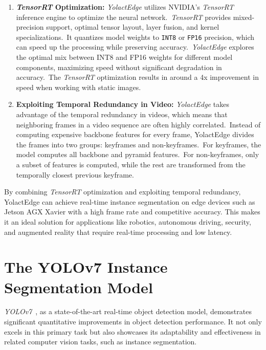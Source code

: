 \begin{enumerate}
    \item \textbf{\textit{TensorRT} Optimization:} \textit{YolactEdge} utilizes NVIDIA's \textit{TensorRT}~\cite{vanholder2016efficient} inference engine to optimize the neural network.\ \textit{TensorRT} provides mixed-precision support, optimal tensor layout, layer fusion, and kernel specializations.\ It quantizes model weights to \texttt{INT8} or \texttt{FP16} precision, which can speed up the processing while preserving accuracy.\ \textit{YolactEdge} explores the optimal mix between INT8 and FP16 weights for different model components, maximizing speed without significant degradation in accuracy.\ The \textit{TensorRT} optimization results in around a 4x improvement in speed when working with static images.
    \item \textbf{Exploiting Temporal Redundancy in Video:} \textit{YolactEdge} takes advantage of the temporal redundancy in videos, which means that neighboring frames in a video sequence are often highly correlated.\ Instead of computing expensive backbone features for every frame, YolactEdge divides the frames into two groups: keyframes and non-keyframes.\ For keyframes, the model computes all backbone and pyramid features.\ For non-keyframes, only a subset of features is computed, while the rest are transformed from the temporally closest previous keyframe.
\end{enumerate}

By combining \textit{TensorRT} optimization and exploiting temporal redundancy, YolactEdge can achieve real-time instance segmentation on edge devices such as Jetson AGX Xavier with a high frame rate and competitive accuracy.
This makes it an ideal solution for applications like robotics, autonomous driving, security, and augmented reality that require real-time processing and low latency.

\section{The YOLOv7 Instance Segmentation Model}
\label{sec:yolovseven}

\textit{YOLOv7}~\cite{wang2022yolov7}, as a state-of-the-art real-time object detection model, demonstrates significant quantitative improvements in object detection performance.
It not only excels in this primary task but also showcases its adaptability and effectiveness in related computer vision tasks, such as instance segmentation.

